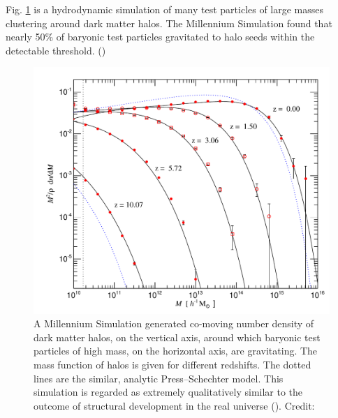 \documentclass{paper}
\begin{document}
  Fig. \ref{fig:Struct-halo_accretion} is a hydrodynamic simulation of many 
  test particles of large masses clustering around dark matter halos. The
  Millennium Simulation found that nearly 50\% of baryonic test particles
  gravitated to halo seeds within the detectable threshold.
  (\cite{2005Natur.435..629S})

  \begin{figure}[H]
    \begin{centering}
    \includegraphics[scale=0.7]{Struct-halo_accretion.pdf}
    \caption{A Millennium Simulation generated co-moving number density of 
      dark matter halos, on the vertical axis, around which baryonic test
      particles of high mass, on the horizontal axis, are gravitating. The
      mass function of halos is given for different redshifts. The dotted
      lines are the similar, analytic Press–Schechter model.  This simulation 
      is regarded as extremely qualitatively similar to the outcome of 
      structural development in the real universe 
      (\cite{desjacques2018large}).
    Credit: \cite{2005Natur.435..629S}}
    \label{fig:Struct-halo_accretion}
    \end{centering}
  \end{figure}
  
\end{document}
